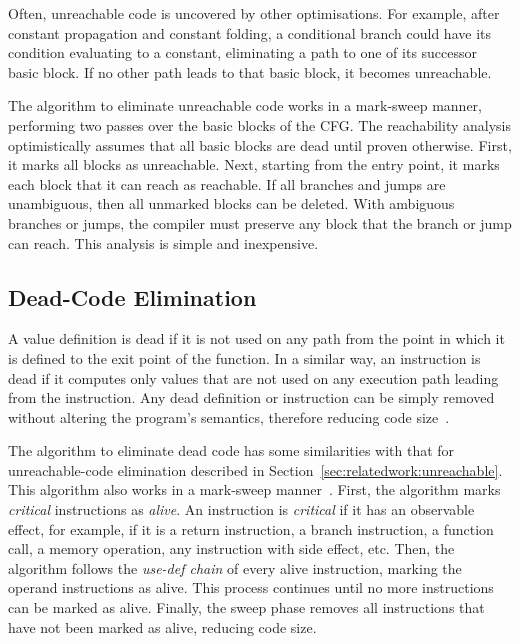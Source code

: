 Often, unreachable code is uncovered by other optimisations.
For example, after constant propagation and constant folding, a conditional branch could have its condition evaluating to a constant, eliminating a path to one of its successor basic block.
If no other path leads to that basic block, it becomes unreachable.

The algorithm to eliminate unreachable code works in a mark-sweep manner, performing two passes over the basic blocks of the CFG.
The reachability analysis optimistically assumes that all basic blocks are dead until proven otherwise.
First, it marks all blocks as unreachable.
Next, starting from the entry point, it marks each block that it can reach as reachable.
If all branches and jumps are unambiguous, then all unmarked blocks can be deleted.
With ambiguous branches or jumps, the compiler must preserve any block that the branch or jump can reach.
This analysis is simple and inexpensive.

\subsection{Dead-Code Elimination} \label{sec:relatedwork:dce}

A value definition is dead if it is not used on any path from the point in which it is defined to the exit point of the function.
In a similar way, an instruction is dead if it computes only values that are not used on any execution path leading from the instruction.
Any dead definition or instruction can be simply removed without altering the program's semantics, therefore reducing code size~\cite{muchnick98}.

The algorithm to eliminate dead code has some similarities with that for unreachable-code elimination described in Section~\ref{sec:relatedwork:unreachable}.
This algorithm also works in a mark-sweep manner~\cite{cooper07}.
First, the algorithm marks \textit{critical} instructions as \textit{alive}.
An instruction is \textit{critical} if it has an observable effect, for example, if it is a return instruction, a branch instruction, a function call, a memory operation, any instruction with side effect, etc.
Then, the algorithm follows the \textit{use-def chain} of every alive instruction, marking the operand instructions as alive.
This process continues until no more instructions can be marked as alive.
Finally, the sweep phase removes all instructions that have not been marked as alive, reducing code size.


